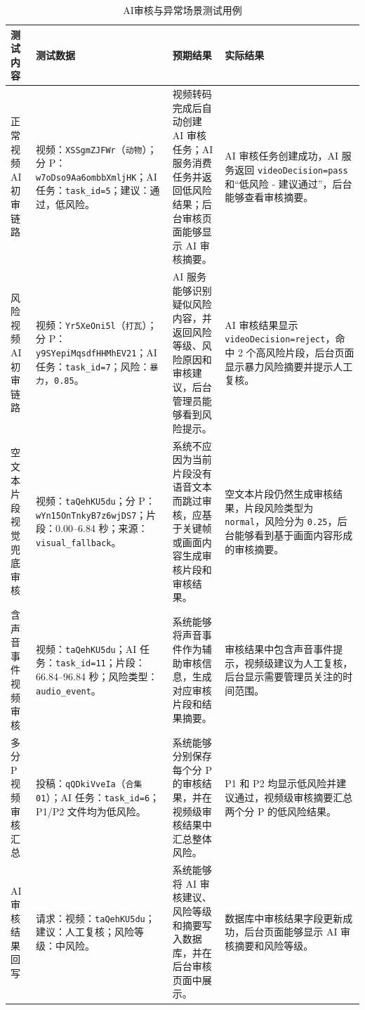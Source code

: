 \begin{table}[!htbp]
	\centering
	\small
	\setlength{\tabcolsep}{4pt}
	\renewcommand{\arraystretch}{1.35}
	\caption{AI审核与异常场景测试用例}
	\label{tab:ai-audit-exception-test}
	\begin{tabular}{p{}p{}p{}p{}}
		\hline
		\textbf{测试内容} & \textbf{测试数据} & \textbf{预期结果} & \textbf{实际结果} \\
		\hline
		正常视频 AI 初审链路 &
		视频：\texttt{XSSgmZJFWr}（\texttt{动物}）；分 P：\texttt{w7oDso9Aa6ombbXmljHK}；AI 任务：\texttt{task\_id=5}；建议：通过，低风险。 &
		视频转码完成后自动创建 AI 审核任务；AI 服务消费任务并返回低风险结果；后台审核页面能够显示 AI 审核摘要。 &
		AI 审核任务创建成功，AI 服务返回 \texttt{videoDecision=pass} 和“低风险 - 建议通过”，后台能够查看审核摘要。 \\
		\hline
		风险视频 AI 初审链路 &
		视频：\texttt{Yr5XeOni5l}（\texttt{打瓦}）；分 P：\texttt{y9SYepiMqsdfHHMhEV21}；AI 任务：\texttt{task\_id=7}；风险：\texttt{暴力}，\texttt{0.85}。 &
		AI 服务能够识别疑似风险内容，并返回风险等级、风险原因和审核建议，后台管理员能够看到风险提示。 &
		AI 审核结果显示 \texttt{videoDecision=reject}，命中 2 个高风险片段，后台页面显示暴力风险摘要并提示人工复核。 \\
		\hline
		空文本片段视觉兜底审核 &
		视频：\texttt{taQehKU5du}；分 P：\texttt{wYn15OnTnkyB7z6wjDS7}；片段：0.00--6.84 秒；来源：\texttt{visual\_fallback}。 &
		系统不应因为当前片段没有语音文本而跳过审核，应基于关键帧或画面内容生成审核片段和审核结果。 &
		空文本片段仍然生成审核结果，片段风险类型为 \texttt{normal}，风险分为 \texttt{0.25}，后台能够看到基于画面内容形成的审核摘要。 \\
		\hline
		含声音事件视频审核 &
		视频：\texttt{taQehKU5du}；AI 任务：\texttt{task\_id=11}；片段：66.84--96.84 秒；风险类型：\texttt{audio\_event}。 &
		系统能够将声音事件作为辅助审核信息，生成对应审核片段和结果摘要。 &
		审核结果中包含声音事件提示，视频级建议为人工复核，后台显示需要管理员关注的时间范围。 \\
		\hline
		多分 P 视频审核汇总 &
		投稿：\texttt{qQDkiVveIa}（\texttt{合集01}）；AI 任务：\texttt{task\_id=6}；P1/P2 文件均为低风险。 &
		系统能够分别保存每个分 P 的审核结果，并在视频级审核结果中汇总整体风险。 &
		P1 和 P2 均显示低风险并建议通过，视频级审核摘要汇总两个分 P 的低风险结果。 \\
		\hline
		AI 审核结果回写 &
		请求：视频：\texttt{taQehKU5du}；建议：人工复核；风险等级：中风险。 &
		系统能够将 AI 审核建议、风险等级和摘要写入数据库，并在后台审核页面中展示。 &
		数据库中审核结果字段更新成功，后台页面能够显示 AI 审核摘要和风险等级。 \\
		\hline
	\end{tabular}
\end{table}

